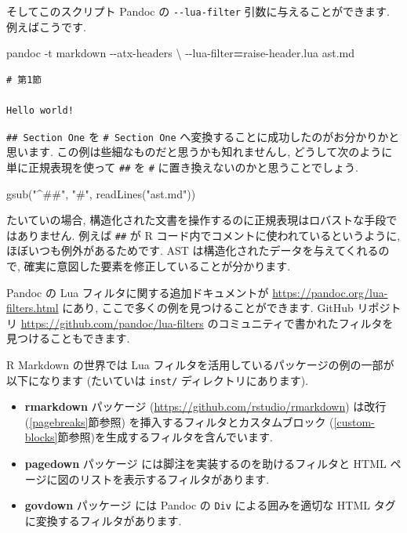 \documentclass[
  11pt,
  lualatex,ja=standard,jafont=noto]{bxjsreport}
\newenvironment{Shaded}{\begin{snugshade}}{\end{snugshade}}
\newcommand{\AttributeTok}[1]{\textcolor[rgb]{0.77,0.63,0.00}{#1}}
\newcommand{\DataTypeTok}[1]{\textcolor[rgb]{0.13,0.29,0.53}{#1}}
\newcommand{\ExtensionTok}[1]{#1}
\newcommand{\FunctionTok}[1]{\textcolor[rgb]{0.00,0.00,0.00}{#1}}
\newcommand{\NormalTok}[1]{#1}
\newcommand{\OperatorTok}[1]{\textcolor[rgb]{0.81,0.36,0.00}{\textbf{#1}}}
\newcommand{\StringTok}[1]{\textcolor[rgb]{0.31,0.60,0.02}{#1}}
\begin{document}
そしてこのスクリプト Pandoc の \texttt{-\/-lua-filter} 引数に与えることができます. 例えばこうです.

\begin{Shaded}
\begin{Highlighting}[numbers=left,,]
\ExtensionTok{pandoc} \AttributeTok{{-}t}\NormalTok{ markdown }\AttributeTok{{-}{-}atx{-}headers} \DataTypeTok{\textbackslash{}}
  \AttributeTok{{-}{-}lua{-}filter}\OperatorTok{=}\NormalTok{raise{-}header.lua ast.md}
\end{Highlighting}
\end{Shaded}

\begin{verbatim}
# 第1節

Hello world!
\end{verbatim}

\texttt{\#\# Section One} を \texttt{\# Section One} へ変換することに成功したのがお分かりかと思います. この例は些細なものだと思うかも知れませんし, どうして次のように単に正規表現を使って \texttt{\#\#} を \texttt{\#} に置き換えないのかと思うことでしょう.

\begin{Shaded}
\begin{Highlighting}[numbers=left,,]
\FunctionTok{gsub}\NormalTok{(}\StringTok{"\^{}\#\#"}\NormalTok{, }\StringTok{"\#"}\NormalTok{, }\FunctionTok{readLines}\NormalTok{(}\StringTok{"ast.md"}\NormalTok{))}
\end{Highlighting}
\end{Shaded}

たいていの場合, 構造化された文書を操作するのに正規表現はロバストな手段ではありません. 例えば \texttt{\#\#} が R コード内でコメントに使われているというように, ほぼいつも例外があるためです. AST は構造化されたデータを与えてくれるので, 確実に意図した要素を修正していることが分かります.

Pandoc の Lua フィルタに関する追加ドキュメントが \url{https://pandoc.org/lua-filters.html} にあり, ここで多くの例を見つけることができます. GitHub リポジトリ \url{https://github.com/pandoc/lua-filters} のコミュニティで書かれたフィルタを見つけることもできます.

R Markdown の世界では Lua フィルタを活用しているパッケージの例の一部が以下になります (たいていは \texttt{inst/} ディレクトリにあります).

\begin{itemize}
\item
  \textbf{rmarkdown} パッケージ (\url{https://github.com/rstudio/rmarkdown}) は改行 (\ref{pagebreaks}節参照) を挿入するフィルタとカスタムブロック (\ref{custom-blocks}節参照)を生成するフィルタを含んでいます.
\item
  \textbf{pagedown} パッケージ \autocite{R-pagedown} には脚注を実装するのを助けるフィルタと HTML ページに図のリストを表示するフィルタがあります.
\item
  \textbf{govdown} パッケージ \autocite{R-govdown} には Pandoc の \texttt{Div} による囲みを適切な HTML タグに変換するフィルタがあります.
\end{itemize}
\end{document}
